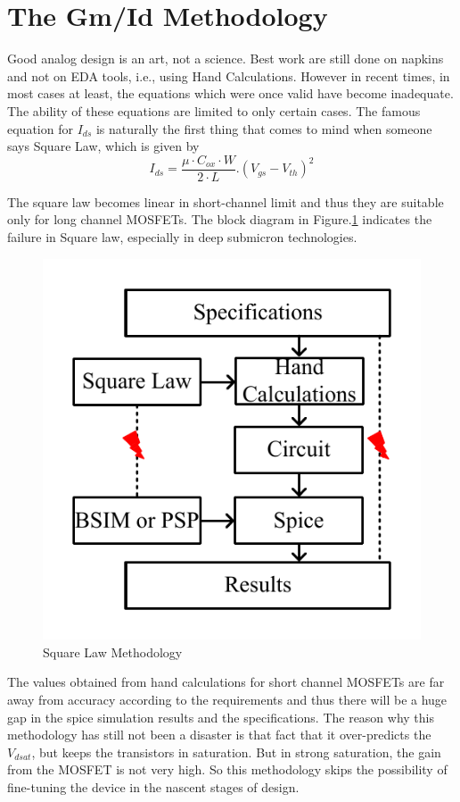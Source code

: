 \section{The Gm/Id Methodology}

Good analog design is an art, not a science. Best work are still done on napkins and not on EDA tools, i.e., using Hand Calculations. However in recent times, in most cases at least, the equations which were once valid have become inadequate. The ability of these equations are limited to only certain cases. The famous equation for $I_{ds}$ is naturally the first thing that comes to mind when someone says Square Law, which is given by 
$$I_{ds} = \frac{\mu \cdot C_{ox}\cdot W}{2\cdot L}.(V_{gs}-V_{th})^2$$

The square law becomes linear in short-channel limit and thus they are suitable only for long channel MOSFETs. The block diagram in Figure.\ref{fig:Square_Law} indicates the failure in Square law, especially in deep submicron technologies.

\begin{figure} [H]
\centering
\includegraphics[scale=1]{Figures/Misc/PDFs/Square_Law.pdf}
\caption{Square Law Methodology}
\label{fig:Square_Law}
\end{figure}

The values obtained from hand calculations for short channel MOSFETs are far away from accuracy according to the requirements and thus there will be a huge gap in the spice simulation results and the specifications. The reason why this methodology has still not been a disaster is that fact that it over-predicts the $V_{dsat}$, but keeps the transistors in saturation. But in strong saturation, the gain from the MOSFET is not very high. So this methodology skips the possibility of fine-tuning the device in the nascent stages of design.

